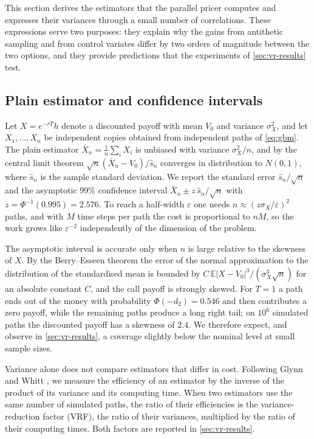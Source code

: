 \documentclass[11pt,a4paper]{article}
\newcommand{\E}{\mathbb{E}}
\begin{document}
This section derives the estimators that the parallel pricer computes and expresses their variances through a small number of correlations.
These expressions serve two purposes: they explain why the gains from antithetic sampling and from control variates differ by two orders of magnitude between the two options, and they provide predictions that the experiments of \cref{sec:vr-results} test.

\subsection{Plain estimator and confidence intervals}\label{sec:plain}

Let $X = e^{-rT}h$ denote a discounted payoff with mean $V_0$ and variance $\sigma_X^2$, and let $X_1,\dots,X_n$ be independent copies obtained from independent paths of \cref{eq:gbm}.
The plain estimator $\bar X_n = \frac1n\sum_i X_i$ is unbiased with variance $\sigma_X^2/n$, and by the central limit theorem $\sqrt n(\bar X_n-V_0)/\hat s_n$ converges in distribution to $N(0,1)$, where $\hat s_n$ is the sample standard deviation.
We report the standard error $\hat s_n/\sqrt n$ and the asymptotic 99\% confidence interval $\bar X_n \pm z\,\hat s_n/\sqrt n$ with $z = \Phi^{-1}(0.995) = 2.576$.
To reach a half-width $\varepsilon$ one needs $n\approx (z\sigma_X/\varepsilon)^2$ paths, and with $M$ time steps per path the cost is proportional to $nM$, so the work grows like $\varepsilon^{-2}$ independently of the dimension of the problem.

The asymptotic interval is accurate only when $n$ is large relative to the skewness of $X$.
By the Berry--Esseen theorem the error of the normal approximation to the distribution of the standardised mean is bounded by $C\,\E|X-V_0|^3/(\sigma_X^3\sqrt n)$ for an absolute constant $C$, and the call payoff is strongly skewed.
For $T=1$ a path ends out of the money with probability $\Phi(-d_2) = 0.546$ and then contributes a zero payoff, while the remaining paths produce a long right tail; on $10^6$ simulated paths the discounted payoff has a skewness of $2.4$.
We therefore expect, and observe in \cref{sec:vr-results}, a coverage slightly below the nominal level at small sample sizes.

Variance alone does not compare estimators that differ in cost.
Following Glynn and Whitt \citep{glynn1992}, we measure the efficiency of an estimator by the inverse of the product of its variance and its computing time.
When two estimators use the same number of simulated paths, the ratio of their efficiencies is the variance-reduction factor (VRF), the ratio of their variances, multiplied by the ratio of their computing times.
Both factors are reported in \cref{sec:vr-results}.
\end{document}
